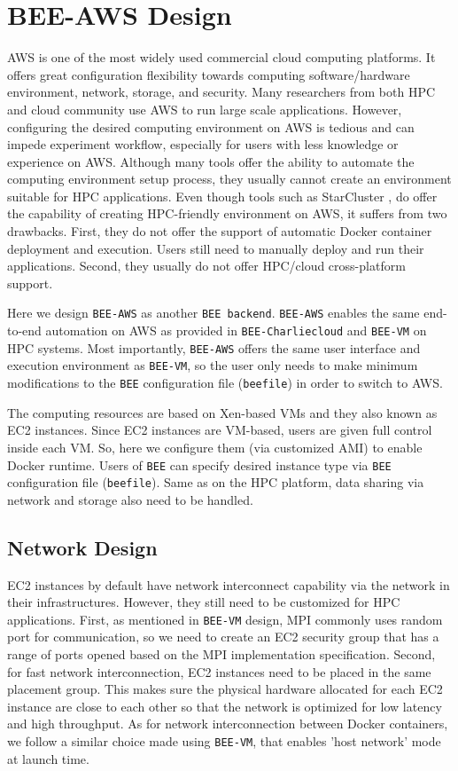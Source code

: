\section{BEE-AWS Design}
\label{bee-aws-section}
AWS is one of the most widely used commercial cloud computing platforms. It offers great configuration flexibility towards computing software/hardware environment, network, storage, and security. Many researchers from both HPC and cloud community use AWS to run large scale applications. However, configuring the desired computing environment on AWS is tedious and can impede experiment workflow, especially for users with less knowledge or experience on AWS. Although many tools offer the ability to automate the computing environment setup process, they usually cannot create an environment suitable for HPC applications. Even though tools such as StarCluster \cite{starcluster}, do offer the capability of creating HPC-friendly environment on AWS, it suffers from two drawbacks. First, they do not offer the support of automatic Docker container deployment and execution. Users still need to manually deploy and run their applications. Second, they usually do not offer HPC/cloud cross-platform support. %

Here we design \texttt{BEE-AWS} as another \texttt{BEE backend}. \texttt{BEE-AWS} enables the same end-to-end automation on AWS as provided in \texttt{BEE-Charliecloud} and \texttt{BEE-VM} on HPC systems. Most importantly, \texttt{BEE-AWS} offers the same user interface and execution environment as \texttt{BEE-VM}, so the user only needs to make minimum modifications to the \texttt{BEE} configuration file (\texttt{beefile}) in order to switch to AWS. 

The computing resources are based on Xen-based VMs and they also known as EC2 instances. Since EC2 instances are VM-based, users are given full control inside each VM. So, here we configure them (via customized AMI) to enable Docker runtime. Users of \texttt{BEE} can specify desired instance type via \texttt{BEE} configuration file (\texttt{beefile}). Same as on the HPC platform, data sharing via network and storage also need to be handled.

\subsection{Network Design}
EC2 instances by default have network interconnect capability via the network in their infrastructures. However, they still need to be customized for HPC applications. First, as mentioned in \texttt{BEE-VM} design, MPI commonly uses random port for communication, so we need to create an EC2 security group that has a range of ports opened based on the MPI implementation specification. Second, for fast network interconnection, EC2 instances need to be placed in the same placement group. This makes sure the physical hardware allocated for each EC2 instance are close to each other so that the network is optimized for low latency and high throughput. As for network interconnection between Docker containers, we follow a similar choice made using \texttt{BEE-VM}, that enables 'host network' mode at launch time.


